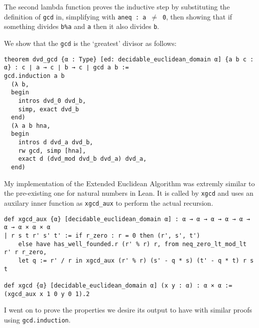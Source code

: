 \documentclass{article}
\newcommand{\ct}{\texttt}
\begin{document}
The second lambda function proves the inductive step by substituting the definition of \ct{gcd} in, simplifying with \ct{aneq : a $\neq$ 0}, then showing that if something divides \ct{b\%a} and \ct{a} then it also divides \ct{b}.

We show that the \ct{gcd} is the `greatest' divisor as follows:
\begin{lstlisting}
theorem dvd_gcd {α : Type} [ed: decidable_euclidean_domain α] {a b c : α} : c ∣ a → c ∣ b → c ∣ gcd a b :=
gcd.induction a b
  (λ b,
  begin
    intros dvd_0 dvd_b,
    simp, exact dvd_b
  end)
  (λ a b hna,
  begin
    intros d dvd_a dvd_b,
    rw gcd, simp [hna],
    exact d (dvd_mod dvd_b dvd_a) dvd_a,
  end)
\end{lstlisting}

My implementation of the Extended Euclidean Algorithm was extremly similar to the pre-existing one for natural numbers in Lean. It is called by \ct{xgcd} and uses an auxilary inner function as \ct{xgcd\_aux} to perform the actual recursion.
\begin{lstlisting}
def xgcd_aux {α} [decidable_euclidean_domain α] : α → α → α → α → α → α → α × α × α
| r s t r' s' t' := if r_zero : r = 0 then (r', s', t') 
    else have has_well_founded.r (r' % r) r, from neq_zero_lt_mod_lt r' r r_zero,
    let q := r' / r in xgcd_aux (r' % r) (s' - q * s) (t' - q * t) r s t

def xgcd {α} [decidable_euclidean_domain α] (x y : α) : α × α := (xgcd_aux x 1 0 y 0 1).2
\end{lstlisting}

I went on to prove the properties we desire its output to have with similar proofs using \ct{gcd.induction}.

\end{document}
